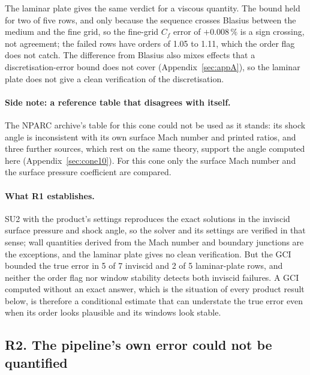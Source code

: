 \documentclass[twocolumn]{labreport}
\begin{document}
The laminar plate gives the same verdict for a viscous quantity.
The bound held for two of five rows, and only because the sequence crosses Blasius between the medium and the fine grid, so the fine-grid $C_f$ error of $+0.008\,\%$ is a sign crossing, not agreement; the failed rows have orders of 1.05 to 1.11, which the order flag does not catch.
The difference from Blasius also mixes effects that a discretisation-error bound does not cover (Appendix~\ref{sec:appA}), so the laminar plate does not give a clean verification of the discretisation.

\paragraph{Side note: a reference table that disagrees with itself.}
The NPARC archive's table for this cone \citep{nparc_cone10} could not be used as it stands: its shock angle is inconsistent with its own surface Mach number and printed ratios, and three further sources, which rest on the same theory, support the angle computed here (Appendix~\ref{sec:cone10}).
For this cone only the surface Mach number and the surface pressure coefficient are compared.

\paragraph{What R1 establishes.}
SU2 with the product's settings reproduces the exact solutions in the inviscid surface pressure and shock angle, so the solver and its settings are verified in that sense; wall quantities derived from the Mach number and boundary junctions are the exceptions, and the laminar plate gives no clean verification.
But the GCI bounded the true error in 5 of 7 inviscid and 2 of 5 laminar-plate rows, and neither the order flag nor window stability detects both inviscid failures.
A GCI computed without an exact answer, which is the situation of every product result below, is therefore a conditional estimate that can understate the true error even when its order looks plausible and its windows look stable.

\subsection{R2. The pipeline's own error could not be quantified}
\label{sec:r2}
\end{document}
